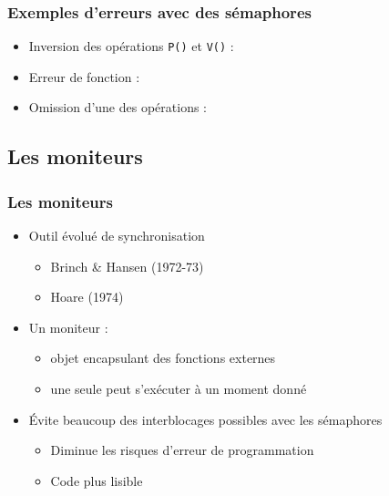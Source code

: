 \begin{frame}
\frametitle{Exemples d’erreurs avec des sémaphores}
\begin{itemize}
\item <1-> Inversion des opérations \texttt{P()} et \texttt{V()} :\\
\begin{scriptsize}

\end{scriptsize}
\item <2-> Erreur de fonction :\\
\begin{scriptsize}

\end{scriptsize}
\item <3-> Omission d’une des opérations :\\
\begin{scriptsize}

\end{scriptsize}
\end{itemize}
\end{frame}
\subsection{Les moniteurs}

\begin{frame}
\frametitle{Les moniteurs}
\begin{itemize}
\item <1-> Outil évolué de synchronisation
\begin{itemize}
\item Brinch \& Hansen (1972-73)
\item Hoare (1974)
\end{itemize}
\item <2-> Un moniteur :
\begin{itemize}
\item objet encapsulant des fonctions externes
\item une seule peut s’exécuter à un moment donné
\end{itemize}
\item <3-> Évite beaucoup des interblocages possibles avec les sémaphores
\begin{itemize}
\item Diminue les risques d'erreur de programmation
\item Code plus lisible
\end{itemize}
\end{itemize}
\end{frame}

